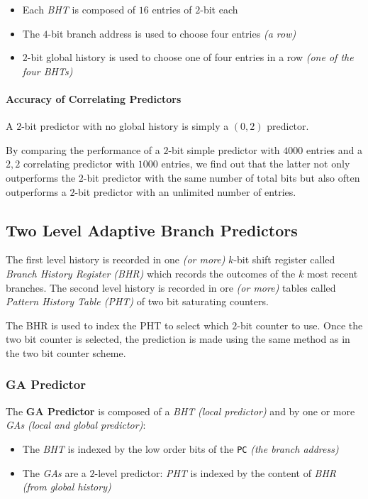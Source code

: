 \documentclass[english]{article}
\begin{document}
\begin{itemize}
  \item Each \textit{BHT} is composed of \(16\) entries of \(2\)-bit each
  \item The \(4\)-bit branch address is used to choose four entries \textit{(a row)}
  \item \(2\)-bit global history is used to choose one of four entries in a row \textit{(one of the four \textit{BHTs})}
\end{itemize}

\paragraph{Accuracy of Correlating Predictors}

A \(2\)-bit predictor with no global history is simply a \((0, 2)\) predictor.

By comparing the performance of a \(2\)-bit simple predictor with \(4000\) entries and a \(2, 2\) correlating predictor with \(1000\) entries, we find out that the latter not only outperforms the \(2\)-bit predictor with the same number of total bits but also often outperforms a \(2\)-bit predictor with an unlimited number of entries.

\subsection{Two Level Adaptive Branch Predictors}

The first level history is recorded in one \textit{(or more)} \(k\)-bit shift register called \textit{Branch History Register (BHR)} which records the outcomes of the \(k\) most recent branches.
The second level history is recorded in ore \textit{(or more)} tables called \textit{Pattern History Table (PHT)} of two bit saturating counters.

The BHR is used to index the PHT to select which \(2\)-bit counter to use.
Once the two bit counter is selected, the prediction is made using the same method as in the two bit counter scheme.

\subsubsection{GA Predictor}

The \textbf{GA Predictor} is composed of a \textit{BHT} \textit{(local predictor)} and by one or more \textit{GAs} \textit{(local and global predictor)}:

\begin{itemize}
  \item The \textit{BHT} is indexed by the low order bits of the \texttt{PC} \textit{(the branch address)}
  \item The \textit{GAs} are a \(2\)-level predictor: \textit{PHT} is indexed by the content of \textit{BHR} \textit{(from global history)}
\end{itemize}
\end{document}
